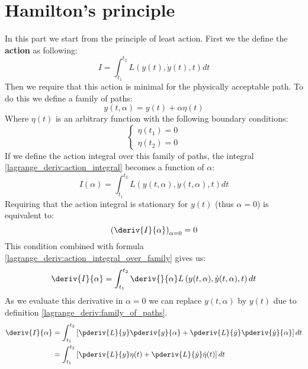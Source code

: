 \section{Hamilton's principle}
	In this part we start from the principle of least action. First we the define the \textbf{action} as following:
    \begin{equation}
		\label{lagrange_deriv:action_integral}
        \boxed{I = \int_{t_1}^{t_2}L\left(y(t), \dot{y}(t), t\right)dt}
	\end{equation}
    Then we require that this action is minimal for the physically acceptable path.
    To do this we define a family of paths:
    \begin{equation}
		\label{lagrange_deriv:family_of_paths}
        y(t, \alpha) = y(t) + \alpha\eta(t)
	\end{equation}
    Where $\eta(t)$ is an arbitrary function with the following boundary conditions:
    \begin{equation}
	    \left\{
        \begin{aligned}
        \eta(t_1) = 0\\
        \eta(t_2) = 0
        \end{aligned}
		\right.
	\end{equation}
    If we define the action integral over this family of paths, the integral \ref{lagrange_deriv:action_integral} becomes a function of $\alpha$:
    \begin{equation}
		\label{lagrange_deriv:action_integral_over_family}
        I(\alpha) = \int_{t_1}^{t_2}L\left(y(t,\alpha), \dot{y}(t, \alpha), t\right)dt
	\end{equation}
    Requiring that the action integral is stationary for $y(t)$ (thus $\alpha = 0$) is equivalent to:
    \begin{equation}
		\label{lagrange_deriv:stationary_condition}
        \left(\deriv{I}{\alpha}\right)_{\alpha=0} = 0
	\end{equation}
    This condition combined with formula \ref{lagrange_deriv:action_integral_over_family} gives us:
    \begin{equation}
    	\label{lagrange_deriv:derivative_of_integral}
        \deriv{I}{\alpha} = \int_{t_1}^{t_2}\deriv{}{\alpha}L\left(y(t,\alpha), \dot{y}(t, \alpha), t\right)dt
	\end{equation}
    As we evaluate this derivative in $\alpha = 0$ we can replace $y(t, \alpha)$ by $y(t)$ due to definition \ref{lagrange_deriv:family_of_paths}.
	\begin{align}
        \deriv{I}{\alpha}&=\int_{t_1}^{t_2}\left[\pderiv{L}{y}\pderiv{y}{\alpha} + \pderiv{L}{\dot{y}}\pderiv{\dot{y}}{\alpha}\right]dt\nonumber\\
        &=\int_{t_1}^{t_2}\left[\pderiv{L}{y}\eta(t) + \pderiv{L}{\dot{y}}\dot{\eta}(t)\right]dt
	\end{align}
